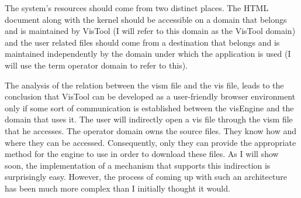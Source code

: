 The system's resources should come from two distinct places. The HTML document along with the kernel should be accessible on a domain that belongs and is maintained by VisTool (I will refer to this domain as the VisTool domain) and the user related files should come from a destination that belongs and is maintained independently by the domain under which the application is used (I will use the term operator domain to refer to this).

The analysis of the relation between the vism file and the vis file, leads to the conclusion that VisTool can be developed as a user-friendly browser environment only if some sort of communication is established between the visEngine and the domain that uses it. The user will indirectly open a vis file through the vism file that he accesses. The operator domain owns the source files. They know how and where they can be accessed. Consequently, only they can provide the appropriate method for the engine to use in order to download these files. As I will show soon, the implementation of a mechanism that supports this indirection is surprisingly easy. However, the process of coming up with such an architecture has been much more complex than I initially thought it would.